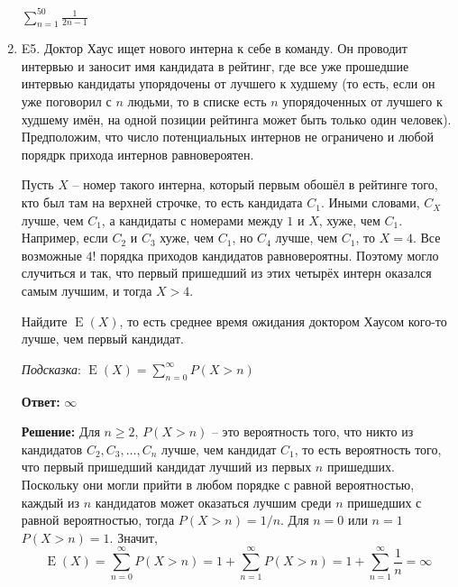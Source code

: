 \documentclass[12pt]{article}
\DeclareMathOperator{\E}{E}
\def \P{P}
\newenvironment{problem}{}{}
\newenvironment{sol}{}{} %
\begin{document}
\begin{enumerate}
\begin{problem}
\begin{sol}
$\sum_{n=1}^{50} \frac{1}{2n-1}$
\end{sol}
\end{problem}

\begin{problem}
\item[E5.] Доктор Хаус ищет нового интерна к себе в команду. Он проводит интервью и заносит имя кандидата в рейтинг, где все уже прошедшие интервью кандидаты упорядочены от лучшего к худшему (то есть, если он уже поговорил с $n$ людьми, то в списке есть $n$ упорядоченных от лучшего к худшему имён, на одной позиции рейтинга может быть только один человек). Предположим, что число потенциальных интернов не ограничено и любой порядрк прихода интернов равновероятен.

Пусть $X$ – номер такого интерна, который первым обошёл в рейтинге того, кто был там на верхней строчке, то есть кандидата $C_1$. Иными словами, $C_X$ лучше, чем $C_1$, а кандидаты с номерами между $1$ и $X$, хуже, чем $C_1$. Например, если $C_2$ и $C_3$ хуже, чем $C_1$, но $C_4$ лучше, чем $C_1$, то $X=4$. Все возможные $4!$ порядка приходов кандидатов равновероятны. Поэтому могло случиться и так, что первый пришедший из этих четырёх интерн оказался самым лучшим, и тогда $X>4$.

Найдите $\E(X)$, то есть среднее время ожидания доктором Хаусом кого-то лучше, чем первый кандидат.

\textit{Подсказка}: $\E(X) = \sum_{n=0}^{\infty} \P(X>n)$

\begin{sol}
\textbf{Ответ:} $\infty$

\textbf{Решение:} Для $n \geq 2$, $\P(X>n)$ – это вероятность того, что никто из кандидатов $C_2, C_3, \ldots, C_n$ лучше, чем кандидат $C_1$, то есть вероятность того, что первый пришедший кандидат лучший из первых $n$ пришедших. Поскольку они могли прийти в любом порядке с равной вероятностью, каждый из $n$ кандидатов может оказаться лучшим среди $n$ пришедших с равной вероятностью, тогда $\P(X>n)=1/n$. Для $n=0$ или $n=1$ $\P(X>n) = 1$. Значит,
\[
\E(X) = \sum_{n=0}^{\infty} \P(X>n) = 1 + \sum_{n=1}^{\infty} \P(X>n) = 1 +  \sum_{n=1}^{\infty} \frac{1}{n} = \infty
\]
\end{sol}
\end{problem}

\end{enumerate}
\end{document}

